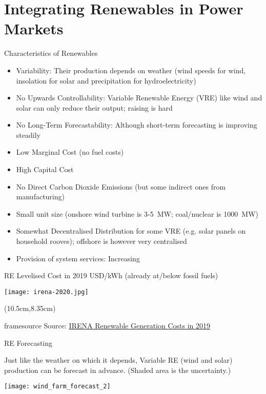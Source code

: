 \documentclass[10pt,aspectratio=169,dvipsnames]{beamer}
\newcommand{\source}[1]{\begin{textblock*}{5cm}(10.5cm,8.35cm)
    \begin{beamercolorbox}[ht=0.5cm,right]{framesource}
        \usebeamerfont{framesource}\usebeamercolor[fg]{framesource} Source: {#1}
    \end{beamercolorbox}
\end{textblock*}}
\let\olditem\item
\renewcommand{\item}{%
\olditem\vspace{5pt}}
\begin{document}
\section{Integrating Renewables in Power Markets}


\begin{frame}{Characteristics of Renewables}

  \begin{itemize}
  \item \alert{Variability}: Their production depends on weather (wind speeds for wind, insolation for solar and precipitation for hydroelectricity)
  \item \alert{No Upwards Controllability}: Variable Renewable Energy (VRE) like wind and solar can only reduce their output; raising is hard
  \item \alert{No Long-Term Forecastability}: Although short-term forecasting is improving steadily
  \item \alert{Low Marginal Cost} (no fuel costs)
  \item \alert{High Capital Cost}
  \item \alert{No Direct Carbon Dioxide Emissions} (but some indirect ones from manufacturing)
  \item \alert{Small unit size} (onshore wind turbine is 3-5~MW; coal/nuclear is 1000~MW)
  \item \alert{Somewhat Decentralised Distribution} for some VRE (e.g. solar panels on household rooves); offshore is however very centralised
    \item \alert{Provision of system services}: Increasing
  \end{itemize}

\end{frame}

\begin{frame}{RE Levelised Cost in 2019 USD/kWh  (already at/below fossil fuels)}

  \centering
  \texttt{[image: irena-2020.jpg]}

  \source{\href{https://www.irena.org/publications/2020/Jun/Renewable-Power-Costs-in-2019}{IRENA Renewable Generation Costs in 2019}}
\end{frame}


\begin{frame}{RE Forecasting}

  Just like the weather on which it depends, Variable RE (wind and
  solar) production can be forecast in advance.   (Shaded area is the uncertainty.)

  \centering
  \texttt{[image: wind\_farm\_forecast\_2]}
\end{frame}
\end{document}
